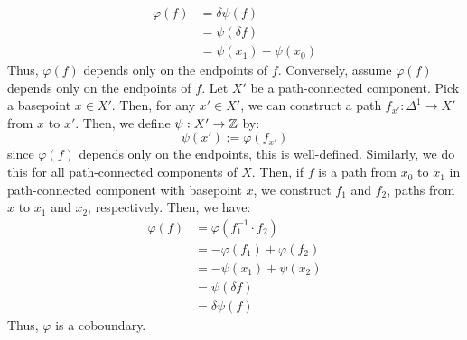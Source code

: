 \documentclass[12pt]{article}
\begin{document}
\begin{solution}
\begin{enumerate}
        \begin{align*}
            \varphi(f) &= \delta \psi(f) \\
            &= \psi(\delta f) \\
            &= \psi(x_1) - \psi(x_0)
        \end{align*}
        Thus, $\varphi(f)$ depends only on the endpoints of $f$. \bbni
        Conversely, assume $\varphi(f)$ depends only on the endpoints of $f$. Let $X'$ be a path-connected component. Pick a basepoint $x \in X'$. Then, for any $x' \in X'$, we can construct a path $f_{x'}: \Delta^1 \to X'$ from $x$ to $x'$. Then, we define $\psi: X' \to \mathbb Z$ by:
        \[ \psi(x') := \varphi(f_{x'})\]
        since $\varphi(f)$ depends only on the endpoints, this is well-defined. Similarly, we do this for all path-connected components of $X$. Then, if $f$ is a path from $x_0$ to $x_1$ in path-connected component with basepoint $x$, we construct $f_1$ and $f_2$, paths from $x$ to $x_1$ and $x_2$, respectively. Then, we have:
        \begin{align*}
            \varphi(f) &= \varphi(f_1^{-1} \cdot f_2) \\
            &= -\varphi(f_1) + \varphi(f_2) \\
            &= -\psi(x_1) + \psi(x_2) \\
            &= \psi(\delta f) \\
            &= \delta \psi(f)
        \end{align*}
        Thus, $\varphi$ is a coboundary.
    \end{enumerate}
\end{solution}
\newpage
\end{document}
